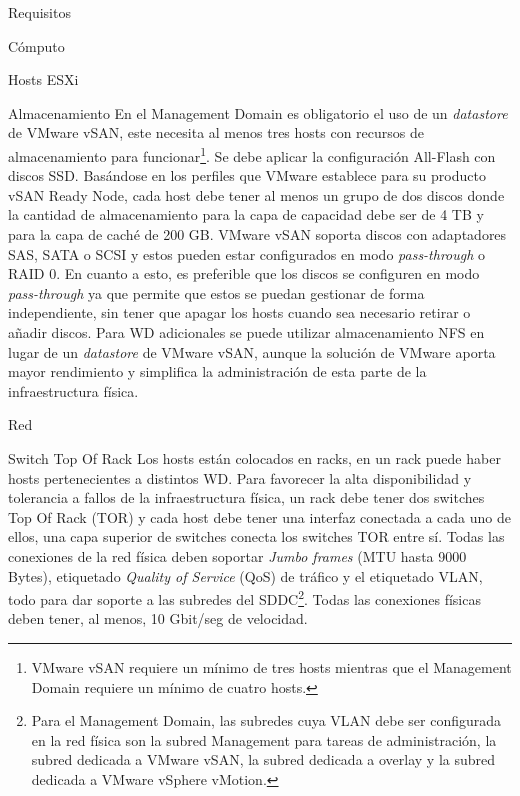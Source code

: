 \begin{section}{Requisitos}
\begin{subsection}{Cómputo}
\begin{subsubsection}{Hosts ESXi}
\end{subsubsection}
\end{subsection}
\begin{subsection}{Almacenamiento}
    En el Management Domain es obligatorio el uso de un \textit{datastore} de VMware vSAN, este necesita al menos tres hosts con recursos de almacenamiento para funcionar\footnote{VMware vSAN requiere un mínimo de tres hosts mientras que el Management Domain requiere un mínimo de cuatro hosts.}. Se debe aplicar la configuración All-Flash con discos SSD. Basándose en los perfiles que VMware establece para su producto vSAN Ready Node\cite{host-requirements}, cada host debe tener al menos un grupo de dos discos donde la cantidad de almacenamiento para la capa de capacidad debe ser de 4 TB y para la capa de caché de 200 GB. VMware vSAN soporta discos con adaptadores SAS, SATA o SCSI y estos pueden estar configurados en modo \textit{pass-through} o RAID 0. En cuanto a esto, es preferible que los discos se configuren en modo \textit{pass-through} ya que permite que estos se puedan gestionar de forma independiente, sin tener que apagar los hosts cuando sea necesario retirar o añadir discos.
    Para WD adicionales se puede utilizar almacenamiento NFS en lugar de un \textit{datastore} de VMware vSAN, aunque la solución de VMware aporta mayor rendimiento y simplifica la administración de esta parte de la infraestructura física.
\end{subsection}
\begin{subsection}{Red}
 \begin{subsubsection}{Switch Top Of Rack}
     Los hosts están colocados en racks, en un rack puede haber hosts pertenecientes a distintos WD. Para favorecer la alta disponibilidad y tolerancia a fallos de la infraestructura física, un rack debe tener dos switches Top Of Rack (TOR) y cada host debe tener una interfaz conectada a cada uno de ellos, una capa superior de switches conecta los switches TOR entre sí. Todas las conexiones de la red física deben soportar \textit{Jumbo frames} (MTU hasta 9000 Bytes), etiquetado \textit{Quality of Service} (QoS) de tráfico y el etiquetado VLAN, todo para dar soporte a las subredes del SDDC\footnote{Para el Management Domain, las subredes cuya VLAN debe ser configurada en la red física son la subred Management para tareas de administración, la subred dedicada a VMware vSAN, la subred dedicada a overlay y la subred dedicada a VMware vSphere vMotion.}. Todas las conexiones físicas deben tener, al menos, 10 Gbit/seg de velocidad.

\end{subsubsection}
\end{subsection}
\end{section}
